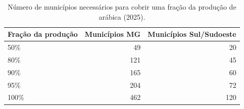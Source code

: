 \begin{table}[htbp]
\centering
\small
\caption{Número de municípios necessários para cobrir uma fração da produção de arábica (2025).}
\label{tab:concentracao}
\begin{tabular}{lrr}
\toprule
Fração da produção & Municípios MG & Municípios Sul/Sudoeste \\
\midrule
50\% & 49 & 20 \\
80\% & 121 & 45 \\
90\% & 165 & 60 \\
95\% & 204 & 72 \\
100\% & 462 & 120 \\
\bottomrule
\end{tabular}
\end{table}
